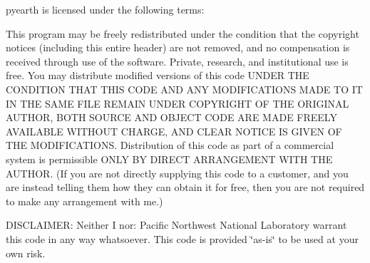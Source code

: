 {\ttfamily pyearth} is licensed under the following terms\-:

This program may be freely redistributed under the condition that the copyright notices (including this entire header) are not removed, and no compensation is received through use of the software. Private, research, and institutional use is free. You may distribute modified versions of this code {\ttfamily U\-N\-D\-E\-R T\-H\-E C\-O\-N\-D\-I\-T\-I\-O\-N T\-H\-A\-T T\-H\-I\-S C\-O\-D\-E A\-N\-D A\-N\-Y M\-O\-D\-I\-F\-I\-C\-A\-T\-I\-O\-N\-S M\-A\-D\-E T\-O I\-T I\-N T\-H\-E S\-A\-M\-E F\-I\-L\-E R\-E\-M\-A\-I\-N U\-N\-D\-E\-R C\-O\-P\-Y\-R\-I\-G\-H\-T O\-F T\-H\-E O\-R\-I\-G\-I\-N\-A\-L A\-U\-T\-H\-O\-R, B\-O\-T\-H S\-O\-U\-R\-C\-E A\-N\-D O\-B\-J\-E\-C\-T C\-O\-D\-E A\-R\-E M\-A\-D\-E F\-R\-E\-E\-L\-Y A\-V\-A\-I\-L\-A\-B\-L\-E W\-I\-T\-H\-O\-U\-T C\-H\-A\-R\-G\-E, A\-N\-D C\-L\-E\-A\-R N\-O\-T\-I\-C\-E I\-S G\-I\-V\-E\-N O\-F T\-H\-E M\-O\-D\-I\-F\-I\-C\-A\-T\-I\-O\-N\-S}. Distribution of this code as part of a commercial system is permissible {\ttfamily O\-N\-L\-Y B\-Y D\-I\-R\-E\-C\-T A\-R\-R\-A\-N\-G\-E\-M\-E\-N\-T W\-I\-T\-H T\-H\-E A\-U\-T\-H\-O\-R}. (If you are not directly supplying this code to a customer, and you are instead telling them how they can obtain it for free, then you are not required to make any arrangement with me.)

{\ttfamily D\-I\-S\-C\-L\-A\-I\-M\-E\-R}\-: Neither I nor\-: Pacific Northwest National Laboratory warrant this code in any way whatsoever. This code is provided \char`\"{}as-\/is\char`\"{} to be used at your own risk. 